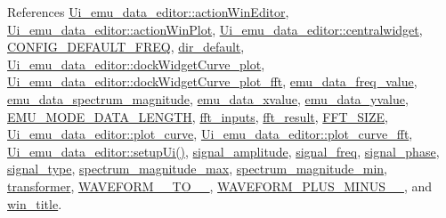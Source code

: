 References \hyperlink{a00051_source_l00040}{Ui\+\_\+emu\+\_\+data\+\_\+editor\+::action\+Win\+Editor}, \hyperlink{a00051_source_l00039}{Ui\+\_\+emu\+\_\+data\+\_\+editor\+::action\+Win\+Plot}, \hyperlink{a00051_source_l00043}{Ui\+\_\+emu\+\_\+data\+\_\+editor\+::centralwidget}, \hyperlink{a00031_source_l00004}{C\+O\+N\+F\+I\+G\+\_\+\+D\+E\+F\+A\+U\+L\+T\+\_\+\+F\+R\+E\+Q}, \hyperlink{a00036_source_l00055}{dir\+\_\+default}, \hyperlink{a00051_source_l00049}{Ui\+\_\+emu\+\_\+data\+\_\+editor\+::dock\+Widget\+Curve\+\_\+plot}, \hyperlink{a00051_source_l00067}{Ui\+\_\+emu\+\_\+data\+\_\+editor\+::dock\+Widget\+Curve\+\_\+plot\+\_\+fft}, \hyperlink{a00036_source_l00051}{emu\+\_\+data\+\_\+freq\+\_\+value}, \hyperlink{a00036_source_l00052}{emu\+\_\+data\+\_\+spectrum\+\_\+magnitude}, \hyperlink{a00036_source_l00046}{emu\+\_\+data\+\_\+xvalue}, \hyperlink{a00036_source_l00045}{emu\+\_\+data\+\_\+yvalue}, \hyperlink{a00003_source_l00031}{E\+M\+U\+\_\+\+M\+O\+D\+E\+\_\+\+D\+A\+T\+A\+\_\+\+L\+E\+N\+G\+T\+H}, \hyperlink{a00036_source_l00050}{fft\+\_\+inputs}, \hyperlink{a00036_source_l00049}{fft\+\_\+result}, \hyperlink{a00036_source_l00012}{F\+F\+T\+\_\+\+S\+I\+Z\+E}, \hyperlink{a00051_source_l00053}{Ui\+\_\+emu\+\_\+data\+\_\+editor\+::plot\+\_\+curve}, \hyperlink{a00051_source_l00071}{Ui\+\_\+emu\+\_\+data\+\_\+editor\+::plot\+\_\+curve\+\_\+fft}, \hyperlink{a00051_source_l00073}{Ui\+\_\+emu\+\_\+data\+\_\+editor\+::setup\+Ui()}, \hyperlink{a00036_source_l00042}{signal\+\_\+amplitude}, \hyperlink{a00036_source_l00040}{signal\+\_\+freq}, \hyperlink{a00036_source_l00041}{signal\+\_\+phase}, \hyperlink{a00036_source_l00039}{signal\+\_\+type}, \hyperlink{a00036_source_l00053}{spectrum\+\_\+magnitude\+\_\+max}, \hyperlink{a00036_source_l00054}{spectrum\+\_\+magnitude\+\_\+min}, \hyperlink{a00036_source_l00044}{transformer}, \hyperlink{a00034_source_l00039}{W\+A\+V\+E\+F\+O\+R\+M\+\_\+\_\+\+T\+O\+\_\+\_}, \hyperlink{a00034_source_l00040}{W\+A\+V\+E\+F\+O\+R\+M\+\_\+\+P\+L\+U\+S\+\_\+\+M\+I\+N\+U\+S\+\_\+\_}, and \hyperlink{a00036_source_l00038}{win\+\_\+title}.


